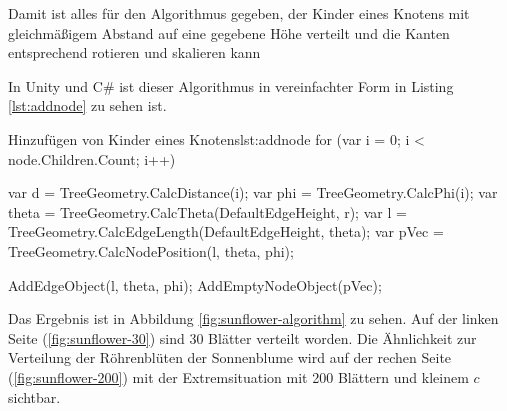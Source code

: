 Damit ist alles für den Algorithmus gegeben, der Kinder eines Knotens mit gleichmäßigem Abstand auf eine gegebene Höhe verteilt und die Kanten entsprechend rotieren und skalieren kann

In Unity und C\# ist dieser Algorithmus in vereinfachter Form in Listing \ref{lst:addnode} zu sehen ist.

\begin{codesnippet}{Hinzufügen von Kinder eines Knotens}{lst:addnode}
for (var i = 0; i < node.Children.Count; i++)
{
    var d = TreeGeometry.CalcDistance(i);
    var phi = TreeGeometry.CalcPhi(i);
    var theta = TreeGeometry.CalcTheta(DefaultEdgeHeight, r);
    var l = TreeGeometry.CalcEdgeLength(DefaultEdgeHeight, theta);
    var pVec = TreeGeometry.CalcNodePosition(l, theta, phi);

    AddEdgeObject(l, theta, phi);
    AddEmptyNodeObject(pVec);
}
\end{codesnippet}

Das Ergebnis ist in Abbildung \ref{fig:sunflower-algorithm} zu sehen. Auf der linken Seite (\ref{fig:sunflower-30}) sind 30 Blätter verteilt worden. Die Ähnlichkeit zur Verteilung der Röhrenblüten der Sonnenblume wird auf der rechen Seite (\ref{fig:sunflower-200}) mit der Extremsituation mit 200 Blättern und kleinem $c$ sichtbar.

